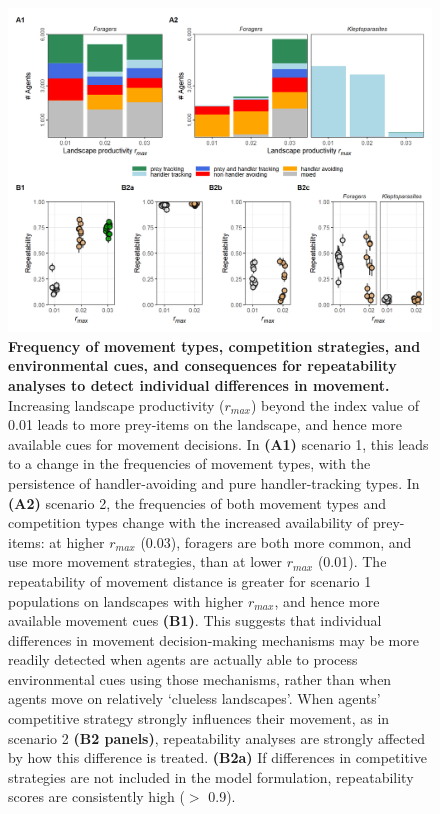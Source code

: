 \begin{figure}[h!]
    \centering
    \includegraphics[width=1.0\textwidth]{figures/patternprocess/fig_03.png}
    \caption{
        \textbf{Frequency of movement types, competition strategies, and environmental cues, and consequences for repeatability analyses to detect individual differences in movement.}
        Increasing landscape productivity ($r_{max}$) beyond the index value of 0.01 leads to more prey-items on the landscape, and hence more available cues for movement decisions.
        In \textbf{(A1)} scenario 1, this leads to a change in the frequencies of movement types, with the persistence of handler-avoiding and pure handler-tracking types.
        In \textbf{(A2)} scenario 2, the frequencies of both movement types and competition types change with the increased availability of prey-items: at higher $r_{max}$ (0.03), foragers are both more common, and use more movement strategies, than at lower $r_{max}$ (0.01).
        The repeatability of movement distance is greater for scenario 1 populations on landscapes with higher $r_{max}$, and hence more available movement cues \textbf{(B1)}.
        This suggests that individual differences in movement decision-making mechanisms may be more readily detected when agents are actually able to process environmental cues using those mechanisms, rather than when agents move on relatively `clueless landscapes'.
        When agents' competitive strategy strongly influences their movement, as in scenario 2 \textbf{(B2 panels)}, repeatability analyses are strongly affected by how this difference is treated.
        \textbf{(B2a)} If differences in competitive strategies are not included in the model formulation, repeatability scores are consistently high ($>$ 0.9).
}
\end{figure}
